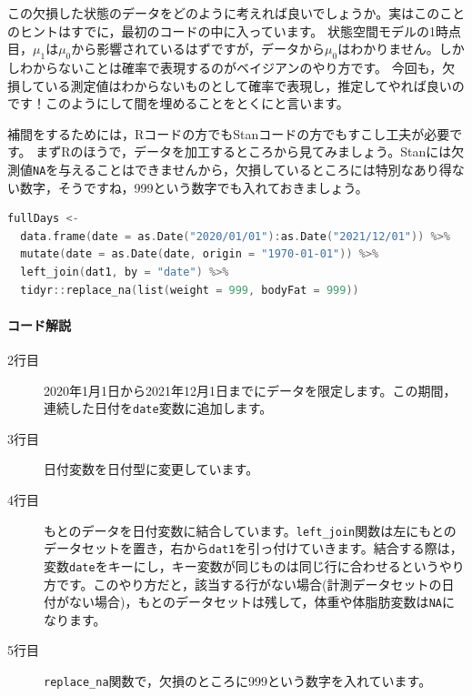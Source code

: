 \documentclass{ltjsbook}
\begin{document}
この欠損した状態のデータをどのように考えれば良いでしょうか。実はこのことのヒントはすでに，最初のコードの中に入っています。
状態空間モデルの1時点目，$\mu_1$は$\mu_0$から影響されているはずですが，データから$\mu_0$はわかりません。しかしわからないことは確率で表現するのがベイジアンのやり方です。
今回も，欠損している測定値はわからないものとして確率で表現し，推定してやれば良いのです！このようにして間を埋めることをとくにと言います。

補間をするためには，Rコードの方でもStanコードの方でもすこし工夫が必要です。
まずRのほうで，データを加工するところから見てみましょう。Stanには欠測値\verb|NA|を与えることはできませんから，欠損しているところには特別なあり得ない数字，そうですね，999という数字でも入れておきましょう。

\begin{lstlisting}[language=c++,label={code:16_04},caption={連続したデータを作り欠測値に仮の値を代入する}]
fullDays <- 
  data.frame(date = as.Date("2020/01/01"):as.Date("2021/12/01")) %>%
  mutate(date = as.Date(date, origin = "1970-01-01")) %>%
  left_join(dat1, by = "date") %>%
  tidyr::replace_na(list(weight = 999, bodyFat = 999))
\end{lstlisting}
\paragraph{コード解説}
\begin{description}
	\item[2行目] 2020年1月1日から2021年12月1日までにデータを限定します。この期間，連続した日付を\verb|date|変数に追加します。
	\item[3行目] 日付変数を日付型に変更しています。
	\item[4行目] もとのデータを日付変数に結合しています。\verb|left_join|関数は左にもとのデータセットを置き，右から\verb|dat1|を引っ付けていきます。結合する際は，変数\verb|date|をキーにし，キー変数が同じものは同じ行に合わせるというやり方です。このやり方だと，該当する行がない場合(計測データセットの日付がない場合)，もとのデータセットは残して，体重や体脂肪変数は\verb|NA|になります。
	\item[5行目] \verb|replace_na|関数で，欠損のところに999という数字を入れています。
\end{description}
\end{document}
